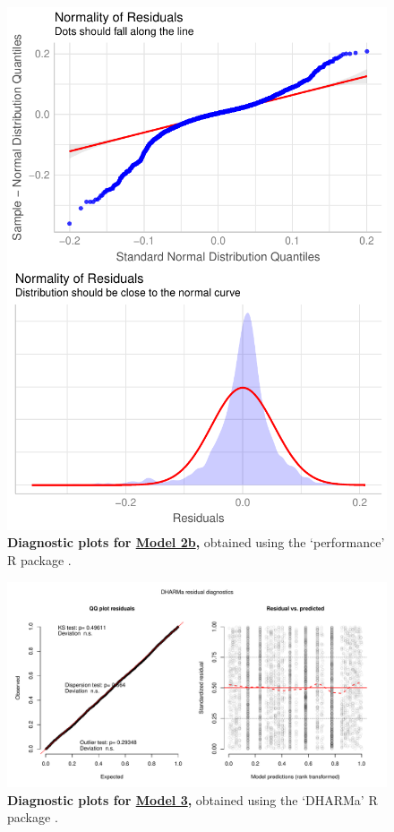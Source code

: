\begin{figure}[h!]
\centering
\includegraphics[scale=0.7]{Supporting/Chapter3/Figures/Diagnostics/SI_diagnostics_Model2b}
\caption[Diagnostic plots for Model 2b]{\textbf{Diagnostic plots for \underline{Model 2b},} obtained using the `performance' R package \citep{performance}.}
\label{SI3_F12}
\end{figure}

\newpage

\begin{figure}[h!]
\centering
\includegraphics[scale=0.6]{Supporting/Chapter3/Figures/Diagnostics/SI_diagnostics_Model3}
\caption[Diagnostic plots for Model 3]{\textbf{Diagnostic plots for \underline{Model 3},} obtained using the `DHARMa' R package \citep{DHARMa}.}
\label{SI3_F13}
\end{figure}

